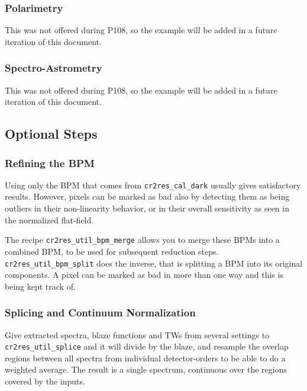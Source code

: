 \subsubsection{Polarimetry}

This was not offered during P108, so the example will be added in a
future iteration of this document.

\subsubsection{Spectro-Astrometry}

This was not offered during P108, so the example will be added in a
future iteration of this document.


\subsection{Optional Steps}

\subsubsection{Refining the BPM}

Using only the BPM that comes from \texttt{cr2res\_cal\_dark} usually gives
satisfactory results. However, pixels can be marked as bad also by detecting
them as being outliers in their non-linearity behavior, or in their overall
sensitivity as seen in the normalized flat-field.

The recipe \texttt{cr2res\_util\_bpm\_merge} allows you to merge these BPMs into
a combined BPM, to be used for subsequent reduction steps.
\texttt{cr2res\_util\_bpm\_split} does the inverse, that is splitting a BPM into
its original components. A pixel can be marked as bad in more than one way and
this is being kept track of.

\subsubsection{Splicing and Continuum Normalization}

Give extracted spectra, blaze functions and TWs from several 
settings to \texttt{cr2res\_util\_splice} and it will divide by the blaze, and 
resample the overlap regions between all spectra from individual detector-orders 
to be able to do a weighted average. The result is a single spectrum, continuous over
the regions covered by the inputs.

